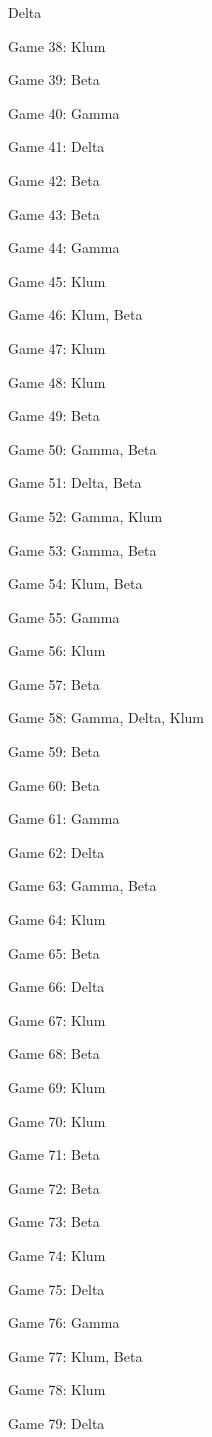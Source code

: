\documentclass{article}
\begin{document}
\begin{multicols}{3}
\begin{compactitem}
Delta
\item Game 38:
Klum
\item Game 39:
Beta
\item Game 40:
Gamma
\item Game 41:
Delta
\item Game 42:
Beta
\item Game 43:
Beta
\item Game 44:
Gamma
\item Game 45:
Klum
\item Game 46:
Klum, Beta
\item Game 47:
Klum
\item Game 48:
Klum
\item Game 49:
Beta
\item Game 50:
Gamma, Beta
\item Game 51:
Delta, Beta
\item Game 52:
Gamma, Klum
\item Game 53:
Gamma, Beta
\item Game 54:
Klum, Beta
\item Game 55:
Gamma
\item Game 56:
Klum
\item Game 57:
Beta
\item Game 58:
Gamma, Delta, Klum
\item Game 59:
Beta
\item Game 60:
Beta
\item Game 61:
Gamma
\item Game 62:
Delta
\item Game 63:
Gamma, Beta
\item Game 64:
Klum
\item Game 65:
Beta
\item Game 66:
Delta
\item Game 67:
Klum
\item Game 68:
Beta
\item Game 69:
Klum
\item Game 70:
Klum
\item Game 71:
Beta
\item Game 72:
Beta
\item Game 73:
Beta
\item Game 74:
Klum
\item Game 75:
Delta
\item Game 76:
Gamma
\item Game 77:
Klum, Beta
\item Game 78:
Klum
\item Game 79:
Delta

\end{compactitem}
\end{multicols}
\end{document}
